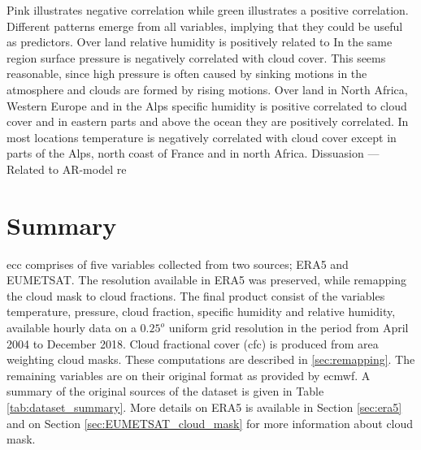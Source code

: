 Pink illustrates negative correlation while green illustrates a positive correlation. Different patterns emerge from all variables, implying that they could be useful as predictors. Over land relative humidity is positively related to 
In the same region surface pressure is negatively correlated with cloud cover. This seems reasonable, since high pressure is often caused by sinking motions in the atmosphere and clouds are formed by rising motions. Over land in North Africa, Western Europe and in the Alps specific humidity is positive correlated to cloud cover and in eastern parts and above the ocean they are positively correlated. In most locations temperature is negatively correlated with cloud cover except in parts of the Alps, north coast of France and in north Africa. 
Dissuasion  --- Related to AR-model re


\section{Summary}
\acrshort{ecc} comprises of five variables collected from two sources; ERA5 and EUMETSAT. The resolution available in ERA5 was preserved, while remapping the cloud mask to cloud fractions. The final product consist of the variables temperature, pressure, cloud fraction, specific humidity and relative humidity, available hourly data on a $0.25^o$ uniform grid resolution in the period from April 2004 to December 2018. Cloud fractional cover (\acrshort{cfc}) is produced from area weighting cloud masks. These computations are described in \ref{sec:remapping}. The remaining variables are on their original format as provided by \acrfull{ecmwf}. A summary of the original sources of the dataset is given in Table \ref{tab:dataset_summary}. More details on ERA5 is available in Section \ref{sec:era5} and on Section \ref{sec:EUMETSAT_cloud_mask} for more information about cloud mask. 



